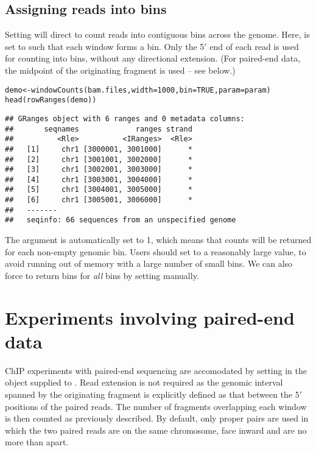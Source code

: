 \documentclass{report}\usepackage[]{graphicx}\usepackage[usenames,dvipsnames]{color}
\newcommand{\hlnum}[1]{\textcolor[rgb]{0.816,0.125,0.439}{#1}}%
\newcommand{\hlstd}[1]{\textcolor[rgb]{0.251,0.251,0.251}{#1}}%
\newcommand{\hlkwb}[1]{\textcolor[rgb]{0,0,0}{#1}}%
\newcommand{\hlkwc}[1]{\textcolor[rgb]{0.251,0.251,0.251}{#1}}%
\newcommand{\hlkwd}[1]{\textcolor[rgb]{0.878,0.439,0.125}{#1}}%
\newenvironment{knitrout}{}{} %
\begin{document}
\subsection{Assigning reads into bins}
Setting  will direct  to count reads into contiguous bins across the genome.
Here,  is set to  such that each window forms a bin.
Only the 5\ensuremath{'} end of each read is used for counting into bins, without any directional extension.
(For paired-end data, the midpoint of the originating fragment is used -- see below.)

\begin{knitrout}
\color{fgcolor}\begin{kframe}
\begin{alltt}
\hlstd{demo} \hlkwb{<-} \hlkwd{windowCounts}\hlstd{(bam.files,} \hlkwc{width}\hlstd{=}\hlnum{1000}\hlstd{,} \hlkwc{bin}\hlstd{=}\hlnum{TRUE}\hlstd{,} \hlkwc{param}\hlstd{=param)}
\hlkwd{head}\hlstd{(}\hlkwd{rowRanges}\hlstd{(demo))}
\end{alltt}
\begin{verbatim}
## GRanges object with 6 ranges and 0 metadata columns:
##       seqnames             ranges strand
##          <Rle>          <IRanges>  <Rle>
##   [1]     chr1 [3000001, 3001000]      *
##   [2]     chr1 [3001001, 3002000]      *
##   [3]     chr1 [3002001, 3003000]      *
##   [4]     chr1 [3003001, 3004000]      *
##   [5]     chr1 [3004001, 3005000]      *
##   [6]     chr1 [3005001, 3006000]      *
##   -------
##   seqinfo: 66 sequences from an unspecified genome
\end{verbatim}
\end{kframe}
\end{knitrout}

The  argument is automatically set to 1, which means that counts will be returned for each non-empty genomic bin.
Users should set  to a reasonably large value, to avoid running out of memory with a large number of small bins.
We can also force  to return bins for \textit{all} bins by setting  manually.

\section{Experiments involving paired-end data}
\label{data:pet}

ChIP experiments with paired-end sequencing are accomodated by setting  in the  object supplied to . 
Read extension is not required as the genomic interval spanned by the originating fragment is explicitly defined as that between the 5\ensuremath{'} positions of the paired reads.
The number of fragments overlapping each window is then counted as previously described. 
By default, only proper pairs are used in which the two paired reads are on the same chromosome, face inward and are no more than  apart.
\end{document}
